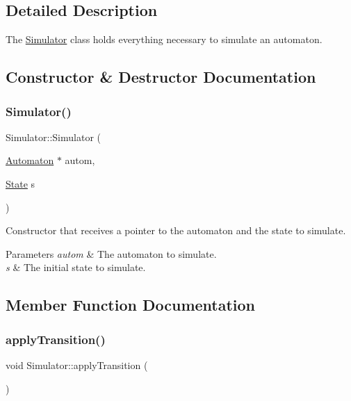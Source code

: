 \subsection{Detailed Description}
The \mbox{\hyperlink{class_simulator}{Simulator}} class holds everything necessary to simulate an automaton. 

\subsection{Constructor \& Destructor Documentation}
\mbox{\label{class_simulator_a367e387c2c34fba34e14dbe1024bc567}} 
\subsubsection{\texorpdfstring{Simulator()}{Simulator()}}
{\footnotesize\ttfamily Simulator\+::\+Simulator (\begin{DoxyParamCaption}\item[{\mbox{\hyperlink{class_automaton}{Automaton}} $\ast$}]{autom,  }\item[{\mbox{\hyperlink{class_state}{State}}}]{s }\end{DoxyParamCaption})\hspace{0.3cm}{\ttfamily [inline]}}

Constructor that receives a pointer to the automaton and the state to simulate.


\begin{DoxyParams}{Parameters}
{\em autom} & The automaton to simulate. \\
\hline
{\em s} & The initial state to simulate. \\
\hline
\end{DoxyParams}


\subsection{Member Function Documentation}
\mbox{\label{class_simulator_a0f40dc39043239da2a50e71e2995e689}} 
\subsubsection{\texorpdfstring{apply\+Transition()}{applyTransition()}}
{\footnotesize\ttfamily void Simulator\+::apply\+Transition (\begin{DoxyParamCaption}{ }\end{DoxyParamCaption})\hspace{0.3cm}{\ttfamily [inline]}}

